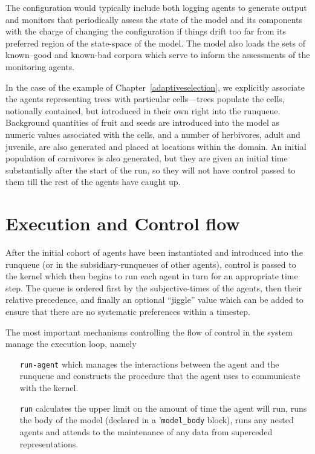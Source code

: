 The configuration would typically include both logging agents to
generate output and monitors that periodically assess the state of the
model and its components with the charge of changing the configuration
if things drift too far from its preferred region of the state-space
of the model.  The model also loads the sets of known--good and
known-bad corpora which serve to inform the assessments of the
monitoring agents.

In the case of the example of Chapter~\ref{adaptiveselection}, we
explicitly associate the agents representing trees with particular
cells---trees populate the cells, notionally contained, but
introduced in their own right into the runqueue.  Background
quantities of fruit and seeds are introduced into the model as numeric
values associated with the cells, and a number of herbivores, adult
and juvenile, are also generated and placed at locations within the
domain. An initial population of carnivores is also generated, but
they are given an initial time substantially after the start of the
run, so they will not have control passed to them till the rest of the
agents have caught up.

\section{Execution and Control flow}

After the initial cohort of agents have been instantiated and
introduced into the runqueue (or in the subsidiary-runqueues of other
agents), control is passed to the kernel which then begins to run each
agent in turn for an appropriate time step. The queue is ordered first
by the subjective-times of the agents, then their relative precedence,
and finally an optional ``jiggle'' value which can be added to ensure
that there are no systematic preferences within a timestep. 

The most important mechanisms controlling the flow of control in the
system manage the execution loop, namely
\begin{itemize}
\item[\texttt{run-agent}] which manages the interactions between the
  agent and the runqueue and constructs the procedure that the agent uses
  to communicate with the kernel.

\item[\texttt{run}] calculates the upper limit on the amount of time the
  agent will run, runs the body of the model (declared in a
  '\texttt{model\_body} block), runs any nested agents and attends to 
  the maintenance of any data from superceded representations.
\end{itemize}

